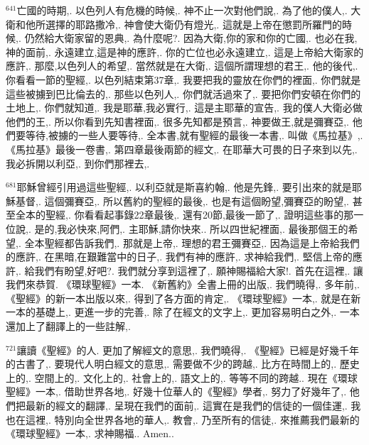 \documentclass{book}
\begin{document}
$^{641}$亡國的時期,.
以色列人有危機的時候,.
神不止一次對他們說,.
為了他的僕人,.
大衛和他所選擇的耶路撒冷,.
神會使大衛仍有燈光,.
這就是上帝在懲罰所羅門的時候,.
仍然給大衛家留的恩典,.
為什麼呢?.
因為大衛,你的家和你的亡國,.
也必在我,神的面前,.
永遠建立,這是神的應許,.
你的亡位也必永遠建立,.
這是上帝給大衛家的應許,.
那麼,以色列人的希望,.
當然就是在大衛,.
這個所謂理想的君王,.
他的後代,.
你看看一節的聖經,.
以色列結束第37章,.
我要把我的靈放在你們的裡面,.
你們就是這些被擄到巴比倫去的,.
那些以色列人,.
你們就活過來了,.
要把你們安頓在你們的土地上,.
你們就知道,.
我是耶華,我必實行,.
這是主耶華的宣告,.
我的僕人大衛必做他們的王,.
所以你看到先知書裡面,.
很多先知都是預言,.
神要做王,就是彌賽亞,.
他們要等待,被擄的一些人要等待,.
全本書,就有聖經的最後一本書,.
叫做《馬拉基》,.
《馬拉基》最後一卷書,.
第四章最後兩節的經文,.
在耶華大可畏的日子來到以先,.
我必拆開以利亞,.
到你們那裡去,.

$^{681}$耶穌曾經引用過這些聖經,.
以利亞就是斯喜約翰,.
他是先鋒,.
要引出來的就是耶穌基督,.
這個彌賽亞,.
所以舊約的聖經的最後,.
也是有這個盼望,彌賽亞的盼望,.
甚至全本的聖經,.
你看看起事錄22章最後,.
還有20節,最後一節了,.
證明這些事的那一位說,.
是的,我必快來,阿們,.
主耶穌,請你快來..
所以四世紀裡面,.
最後那個王的希望,.
全本聖經都告訴我們,.
那就是上帝,.
理想的君王彌賽亞,.
因為這是上帝給我們的應許,.
在黑暗,在艱難當中的日子,.
我們有神的應許,.
求神給我們,.
堅信上帝的應許,.
給我們有盼望,好吧?.
我們就分享到這裡了,.
願神賜福給大家!.
首先在這裡,.
讓我們來恭賀.
《環球聖經》一本.
《新舊約》全書上冊的出版,.
我們曉得,.
多年前,.
《聖經》的新一本出版以來,.
得到了各方面的肯定,.
《環球聖經》一本,.
就是在新一本的基礎上,.
更進一步的完善,.
除了在經文的文字上,.
更加容易明白之外,.
一本還加上了翻譯上的一些註解,.

$^{721}$讓讀《聖經》的人.
更加了解經文的意思,.
我們曉得,.
《聖經》已經是好幾千年的古書了,.
要現代人明白經文的意思,.
需要做不少的跨越,.
比方在時間上的,.
歷史上的,.
空間上的,.
文化上的,.
社會上的,.
語文上的,.
等等不同的跨越..
現在《環球聖經》一本,.
借助世界各地,.
好幾十位華人的《聖經》學者,.
努力了好幾年了,.
他們把最新的經文的翻譯,.
呈現在我們的面前,.
這實在是我們的信徒的一個佳運,.
我也在這裡,.
特別向全世界各地的華人,.
教會,.
乃至所有的信徒,.
來推薦我們最新的《環球聖經》一本,.
求神賜福..
Amen..
\newpage
\end{document}

